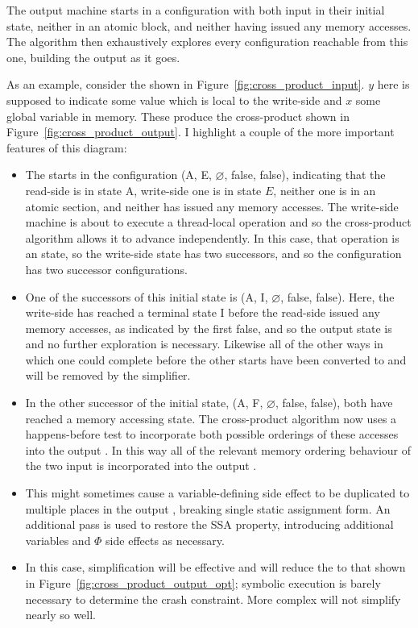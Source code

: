 The output machine starts in a configuration with both input
{\StateMachines} in their initial state, neither in an atomic block,
and neither having issued any memory accesses.  The algorithm then
exhaustively explores every configuration reachable from this one,
building the output {\StateMachine} as it goes.

As an example, consider the {\StateMachines} shown in
Figure~\ref{fig:cross_product_input}.  $y$ here is supposed to
indicate some value which is local to the write-side {\StateMachine}
and $x$ some global variable in memory.  These produce the
cross-product {\StateMachine} shown in
Figure~\ref{fig:cross_product_output}.  I highlight a couple of the more important
features of this diagram:

\begin{itemize}
\item The {\StateMachine} starts in the configuration (A, E,
  $\varnothing$, false, false), indicating that the read-side
  {\StateMachine} is in state A, write-side one is in state $E$,
  neither one is in an atomic section, and neither has issued any
  memory accesses.  The write-side machine is about to execute a
  thread-local operation and so the cross-product algorithm allows it
  to advance independently.  In this case, that operation is an
   state, so the write-side state has two successors, and so
  the configuration has two successor configurations.
\item One of the successors of this initial state is (A, I,
  $\varnothing$, false, false).  Here, the write-side {\StateMachine}
  has reached a terminal state I before the read-side {\StateMachine}
  issued any memory accesses, as indicated by the first false, and so
  the output state is  and no further exploration is
  necessary.  Likewise all of the other ways in which one
  {\StateMachine} could complete before the other starts have been
  converted to  and will be removed by the
  simplifier.
\item In the other successor of the initial state, (A, F,
  $\varnothing$, false, false), both {\StateMachines} have reached a
  memory accessing state.  The cross-product algorithm now uses a
  happens-before test to incorporate both possible orderings of these
  accesses into the output {\StateMachine}.  In this way all of the
  relevant memory ordering behaviour of the two input {\StateMachines}
  is incorporated into the output {\StateMachine}.
\item This might sometimes cause a variable-defining side effect to be
  duplicated to multiple places in the output {\StateMachine},
  breaking single static assignment form.  An additional pass is used
  to restore the SSA property, introducing additional variables and
  $\Phi$ side effects as necessary.
\item In this case, simplification will be effective and will reduce
  the {\StateMachine} to that shown in
  Figure~\ref{fig:cross_product_output_opt}; symbolic execution is
  barely necessary to determine the crash constraint.  More complex
  {\StateMachines} will not simplify nearly so well. 
\end{itemize}

